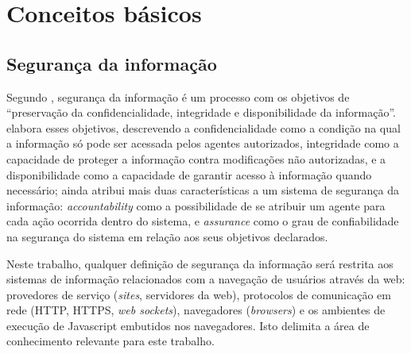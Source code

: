 \section{Conceitos básicos}

\subsection{Segurança da informação}
Segundo \cite{ISO2016}, segurança da informação é um processo com os objetivos de ``preservação da confidencialidade, integridade e disponibilidade da informação''. \cite{Foster1998} elabora esses objetivos, descrevendo a confidencialidade como a condição na qual a informação só pode ser acessada pelos agentes autorizados, integridade como a capacidade de proteger a informação contra modificações não autorizadas, e a disponibilidade como a capacidade de garantir acesso à informação quando necessário; \cite{Foster1998} ainda atribui mais duas características a um sistema de segurança da informação: \textit{accountability} como a possibilidade de se atribuir um agente para cada ação ocorrida dentro do sistema, e \textit{assurance} como o grau de confiabilidade na segurança do sistema em relação aos seus objetivos declarados.

Neste trabalho, qualquer definição de segurança da informação será restrita aos sistemas de informação relacionados com a navegação de usuários através da web: provedores de serviço (\textit{sites}, servidores da web), protocolos de comunicação em rede (HTTP, HTTPS, \textit{web sockets}), navegadores (\textit{browsers}) e os ambientes de execução de Javascript embutidos nos navegadores. Isto delimita a área de conhecimento relevante para este trabalho.


